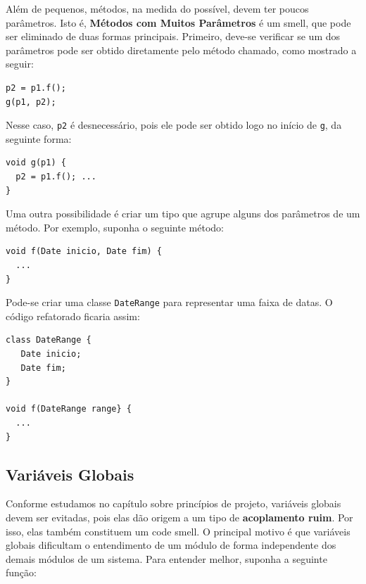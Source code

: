 \documentclass[
  11pt,
  twoside]{book}
\newcommand{\passthrough}[1]{#1}
\begin{document}

Além de pequenos, métodos, na medida do possível, devem ter poucos
parâmetros. Isto é, \textbf{Métodos com Muitos Parâmetros} é um smell,
que pode ser eliminado de duas formas principais. Primeiro, deve-se
verificar se um dos parâmetros pode ser obtido diretamente pelo método
chamado, como mostrado a seguir:

\begin{lstlisting}
p2 = p1.f();
g(p1, p2);
\end{lstlisting}

Nesse caso, \passthrough{\lstinline!p2!} é desnecessário, pois ele pode
ser obtido logo no início de \passthrough{\lstinline!g!}, da seguinte
forma:

\begin{lstlisting}
void g(p1) {
  p2 = p1.f(); ...
}
\end{lstlisting}

Uma outra possibilidade é criar um tipo que agrupe alguns dos parâmetros
de um método. Por exemplo, suponha o seguinte método:

\begin{lstlisting}
void f(Date inicio, Date fim) {
  ...
}
\end{lstlisting}

Pode-se criar uma classe \passthrough{\lstinline!DateRange!} para
representar uma faixa de datas. O código refatorado ficaria assim:

\newpage

\begin{lstlisting}
class DateRange {
   Date inicio;
   Date fim;
}

void f(DateRange range} {
  ...
}
\end{lstlisting}

\hypertarget{variuxe1veis-globais}{%
\subsection{Variáveis Globais}\label{variuxe1veis-globais}}

 

Conforme estudamos no capítulo sobre princípios de projeto, variáveis
globais devem ser evitadas, pois elas dão origem a um tipo de
\textbf{acoplamento ruim}. Por isso, elas também constituem um code
smell. O principal motivo é que variáveis globais dificultam o
entendimento de um módulo de forma independente dos demais módulos de um
sistema. Para entender melhor, suponha a seguinte função:
\end{document}
